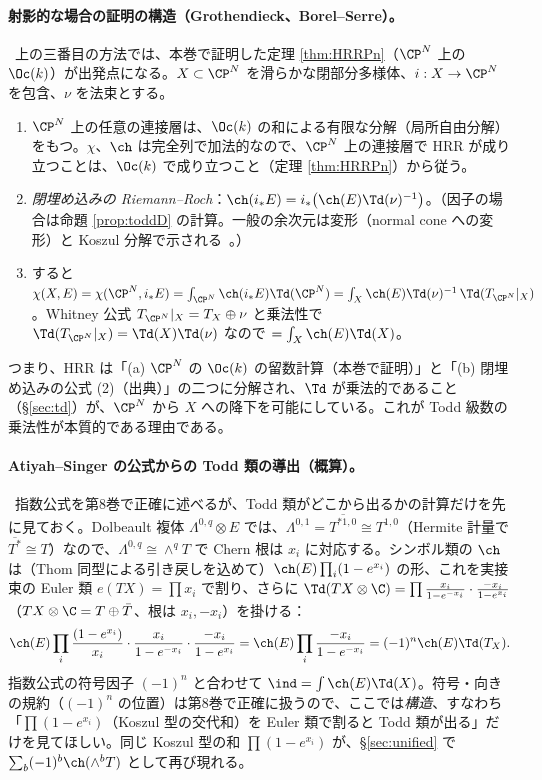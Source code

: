 \paragraph{射影的な場合の証明の構造（Grothendieck、Borel--Serre）。}\tC\ 上の三番目の方法では、本巻で証明した定理 \ref{thm:HRRPn}（$\CP^N$ 上の $\Oc(k)$）が出発点になる。$X\subset\CP^N$ を滑らかな閉部分多様体、$i:X\to\CP^N$ を包含、$\nu$ を法束とする。
\begin{enumerate}
\item[(1)] $\CP^N$ 上の任意の連接層は、$\Oc(k)$ の和による有限な分解（局所自由分解）をもつ。$\chi$、$\ch$ は完全列で加法的なので、$\CP^N$ 上の連接層で HRR が成り立つことは、$\Oc(k)$ で成り立つこと（定理 \ref{thm:HRRPn}）から従う。
\item[(2)] \emph{閉埋め込みの Riemann--Roch}：$\ch(i_*E)=i_*\bigl(\ch(E)\Td(\nu)^{-1}\bigr)$。（因子の場合は命題 \ref{prop:toddD} の計算。一般の余次元は変形（normal cone への変形）と Koszul 分解で示される\tC\ 。）
\item[(3)] すると $\chi(X,E)=\chi(\CP^N,i_*E)=\int_{\CP^N}\ch(i_*E)\Td(\CP^N)=\int_X\ch(E)\Td(\nu)^{-1}\,\Td(T_{\CP^N}|_X)$。Whitney 公式 $T_{\CP^N}|_X=T_X\oplus\nu$ と乗法性で $\Td(T_{\CP^N}|_X)=\Td(X)\Td(\nu)$ なので $=\int_X\ch(E)\Td(X)$。
\end{enumerate}
\begin{center}
\end{center}
つまり、HRR は「(a) $\CP^N$ の $\Oc(k)$ の留数計算（本巻で証明）」と「(b) 閉埋め込みの公式 (2)（出典）」の二つに分解され、$\Td$ が乗法的であること（\S\ref{sec:td}）が、$\CP^N$ から $X$ への降下を可能にしている。これが Todd 級数の乗法性が本質的である理由である。
\paragraph{Atiyah--Singer の公式からの Todd 類の導出（概算）。}\tQ\ 指数公式を第8巻で正確に述べるが、Todd 類がどこから出るかの計算だけを先に見ておく。Dolbeault 複体 $\Lambda^{0,q}\otimes E$ では、$\Lambda^{0,1}=\overline{T^{*1,0}}\cong T^{1,0}$（Hermite 計量で $\overline{T^*}\cong T$）なので、$\Lambda^{0,q}\cong\wedge^qT$ で Chern 根は $x_i$ に対応する。シンボル類の $\ch$ は（Thom 同型による引き戻しを込めて）$\ch(E)\prod_i(1-e^{x_i})$ の形、これを実接束の Euler 類 $e(TX)=\prod x_i$ で割り、さらに $\Td(TX\otimes\C)=\prod\frac{x_i}{1-e^{-x_i}}\cdot\frac{-x_i}{1-e^{x_i}}$（$TX\otimes\C=T\oplus\bar T$、根は $x_i,-x_i$）を掛ける：
\[
\ch(E)\prod_i\frac{(1-e^{x_i})}{x_i}\cdot\frac{x_i}{1-e^{-x_i}}\cdot\frac{-x_i}{1-e^{x_i}}=\ch(E)\prod_i\frac{-x_i}{1-e^{-x_i}}=(-1)^n\ch(E)\Td(T_X).
\]
指数公式の符号因子 $(-1)^n$ と合わせて $\ind=\int\ch(E)\Td(X)$。符号・向きの規約（$(-1)^n$ の位置）は第8巻で正確に扱うので、ここでは\emph{構造}、すなわち「$\prod(1-e^{x_i})$（Koszul 型の交代和）を Euler 類で割ると Todd 類が出る」だけを見てほしい。同じ Koszul 型の和 $\prod(1-e^{x_i})$ が、\S\ref{sec:unified} で $\sum_b(-1)^b\ch(\wedge^bT)$ として再び現れる。



